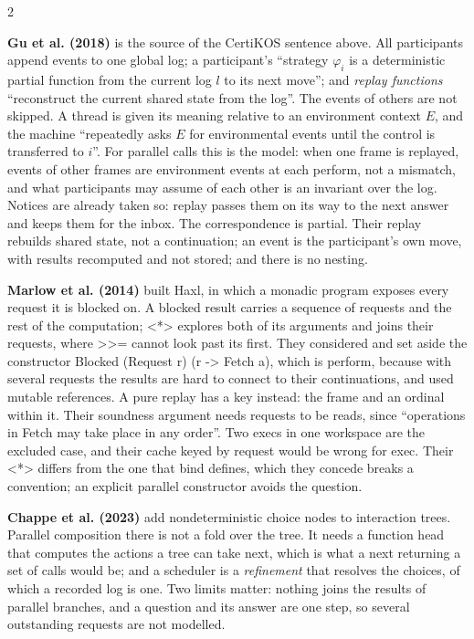 \documentclass{article}
\newcommand{\paper}[1]{\par\smallskip\textbf{#1}\quad}
\newcommand{\cd}[1]{{\ttfamily #1}}
\begin{document}
\begin{multicols}{2}
\paper{Gu et al. (2018)} is the source of the CertiKOS sentence above. All participants append
events to one global log; a participant's ``strategy $\varphi_i$ is a deterministic partial
function from the current log $l$ to its next move''; and \emph{replay functions} ``reconstruct
the current shared state from the log''. The events of others are not skipped. A thread is given
its meaning relative to an environment context $E$, and the machine ``repeatedly asks $E$ for
environmental events until the control is transferred to $i$''. For parallel calls this is the
model: when one frame is replayed, events of other frames are environment events at each
\cd{perform}, not a \cd{mismatch}, and what participants may assume of each other is an invariant
over the log. Notices are already taken so: \cd{replay} passes them on its way to the next
answer and keeps them for the \cd{inbox}. The correspondence is partial. Their replay rebuilds
shared state, not a
continuation; an event is the participant's own move, with results recomputed and not stored;
and there is no nesting.

\paper{Marlow et al. (2014)} built Haxl, in which a monadic program exposes every request it is
blocked on.
A blocked result carries a sequence of requests and the rest of the computation; \cd{<*>}
explores both of its arguments and joins their requests, where \cd{>>=} cannot look past its
first. They considered and set aside the constructor \cd{Blocked (Request r) (r -> Fetch a)},
which is \cd{perform}, because with several requests the results are hard to connect to their
continuations, and used mutable references. A pure \cd{replay} has a key instead: the frame and
an ordinal within it. Their soundness argument needs requests to be reads, since ``operations in
Fetch may take place in any order''. Two \cd{exec}s in one workspace are the excluded case, and
their cache keyed by request would be wrong for \cd{exec}. Their \cd{<*>} differs from the one
that bind defines, which they concede breaks a convention; an explicit parallel constructor
avoids the question.

\paper{Chappe et al. (2023)} add nondeterministic choice nodes to interaction trees. Parallel
composition there is not a fold over the tree. It needs a function \cd{head} that computes the
actions a tree can take next, which is what a \cd{next} returning a set of calls would be; and a
scheduler is a \emph{refinement} that resolves the choices, of which a recorded log is one. Two
limits matter: nothing joins the results of parallel branches, and a question and its answer are
one step, so several outstanding requests are not modelled.


\end{multicols}
\end{document}
